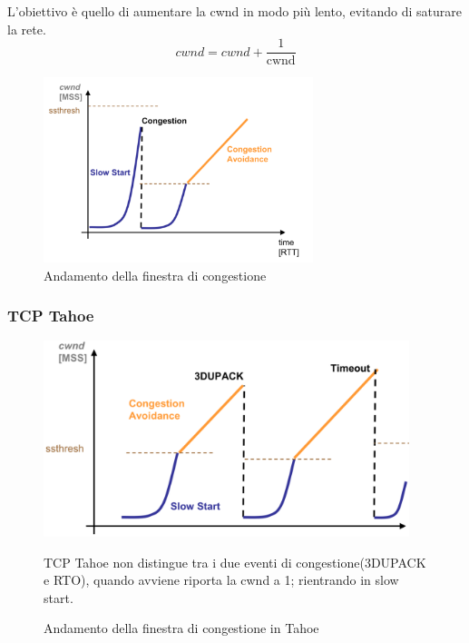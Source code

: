         L'obiettivo è quello di aumentare la cwnd in modo più lento, evitando di saturare la rete.
        \begin{equation}
            cwnd = cwnd + \frac{1}{\text{cwnd}}     \end{equation}
        
  
        \begin{figure}[h!]
        \centering
        \includegraphics[width=0.7\textwidth]{images/graficocongestione.png}
        \caption{Andamento della finestra di congestione}
        \label{fig:graficocongestione}
        \end{figure}

        \newpage

\subsubsection{TCP Tahoe}

\begin{figure}[h!]
    \begin{minipage}{0.6\textwidth}
        \centering
        \includegraphics[width=0.95\textwidth]{images/tahoe.png}
        \caption{Andamento della finestra di congestione in Tahoe}
        \label{fig:tcptahoe}
    \end{minipage}
    \hfill
    \begin{minipage}{0.48\textwidth}
        TCP Tahoe non distingue tra i due eventi di congestione(3DUPACK e RTO), quando avviene riporta la cwnd a 1; rientrando in slow start.
    \end{minipage}
\end{figure}

